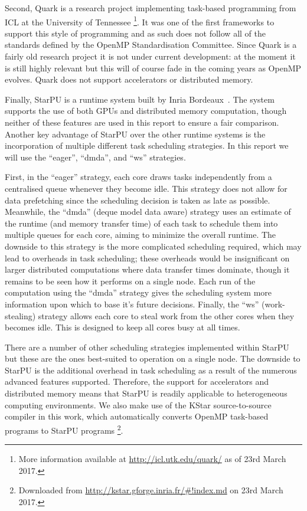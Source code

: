\documentclass[a4paper,12pt]{article}
\begin{document}
Second,
Quark is a research project implementing task-based programming
from ICL at the University of Tennessee%
\footnote{More information available at
  \url{http://icl.utk.edu/quark/} as of 23rd March 2017.}.
It was one of the first frameworks to support this style
of programming and as such does not follow all of the standards
defined by the OpenMP Standardisation Committee.
Since Quark is a fairly old research project it is not under current
development:
at the moment it is still highly relevant but this will of course fade
in the coming years as OpenMP evolves.
Quark does not support accelerators or distributed memory.

Finally,
StarPU is a runtime system built by Inria Bordeaux~\cite{starpu11}.
The system supports the use of both GPUs and
distributed memory computation,
though neither of these features are used in this report
to ensure a fair comparison.
Another key advantage of StarPU over the other runtime systems
is the incorporation of multiple different task scheduling strategies.
In this report we will use the ``eager'', ``dmda'', and ``ws''
strategies.

First,
in the ``eager'' strategy,
each core draws tasks independently from a centralised queue
whenever they become idle.
This strategy does not allow for data prefetching since the scheduling
decision is taken as late as possible.
Meanwhile, the ``dmda'' (deque model data aware) strategy
uses an estimate of the runtime
(and memory transfer time) of each task to schedule them into
multiple queues for each core,
aiming to minimize the overall runtime.
The downside to this strategy is the more complicated scheduling required,
which may lead to overheads in task scheduling;
these overheads would be insignificant on larger distributed computations
where data transfer times dominate,
though it remains to be seen how it performs on a single node.
Each run of the computation using the ``dmda'' strategy
gives the scheduling system more information
upon which to base it's future decisions.
Finally,
the ``ws'' (work-stealing) strategy allows each core to
steal work from the other cores when they becomes idle.
This is designed to keep all cores busy at all times.

There are a number of other scheduling strategies implemented within
StarPU but these are the ones best-suited to
operation on a single node.
The downside to StarPU is the additional overhead in task scheduling
as a result of the numerous advanced features supported.
Therefore,
the support for accelerators and distributed memory
means that StarPU is readily applicable to heterogeneous computing
environments.
We also make use of the KStar source-to-source compiler in this work,
which automatically converts OpenMP task-based programs to
StarPU programs%
\footnote{Downloaded from \url{http://kstar.gforge.inria.fr/#!index.md} on
  23rd March 2017.}.
\end{document}
